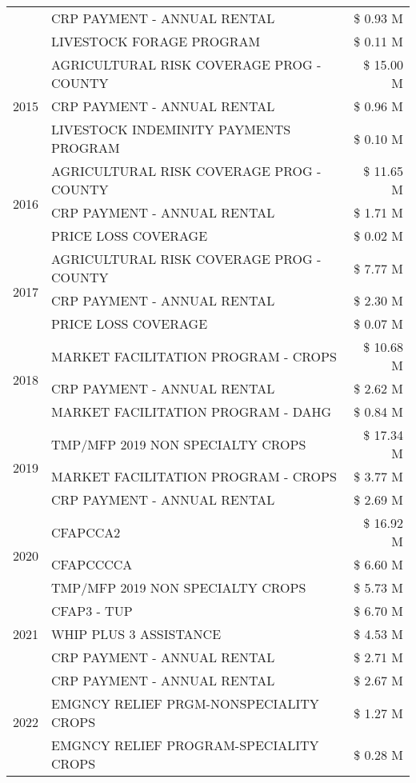 \begin{tabular}{llr}
 & CRP PAYMENT - ANNUAL RENTAL & \$ 0.93 M \\
 & LIVESTOCK FORAGE PROGRAM & \$ 0.11 M \\
\cline{1-3}
\multirow[t]{3}{*}{2015} & AGRICULTURAL RISK COVERAGE PROG - COUNTY & \$ 15.00 M \\
 & CRP PAYMENT - ANNUAL RENTAL & \$ 0.96 M \\
 & LIVESTOCK INDEMINITY PAYMENTS PROGRAM & \$ 0.10 M \\
\cline{1-3}
\multirow[t]{3}{*}{2016} & AGRICULTURAL RISK COVERAGE PROG - COUNTY & \$ 11.65 M \\
 & CRP PAYMENT - ANNUAL RENTAL & \$ 1.71 M \\
 & PRICE LOSS COVERAGE & \$ 0.02 M \\
\cline{1-3}
\multirow[t]{3}{*}{2017} & AGRICULTURAL RISK COVERAGE PROG - COUNTY & \$ 7.77 M \\
 & CRP PAYMENT - ANNUAL RENTAL & \$ 2.30 M \\
 & PRICE LOSS COVERAGE & \$ 0.07 M \\
\cline{1-3}
\multirow[t]{3}{*}{2018} & MARKET FACILITATION PROGRAM - CROPS & \$ 10.68 M \\
 & CRP PAYMENT - ANNUAL RENTAL & \$ 2.62 M \\
 & MARKET FACILITATION PROGRAM - DAHG & \$ 0.84 M \\
\cline{1-3}
\multirow[t]{3}{*}{2019} & TMP/MFP 2019 NON SPECIALTY CROPS & \$ 17.34 M \\
 & MARKET FACILITATION PROGRAM - CROPS & \$ 3.77 M \\
 & CRP PAYMENT - ANNUAL RENTAL & \$ 2.69 M \\
\cline{1-3}
\multirow[t]{3}{*}{2020} & CFAPCCA2 & \$ 16.92 M \\
 & CFAPCCCCA & \$ 6.60 M \\
 & TMP/MFP 2019 NON SPECIALTY CROPS & \$ 5.73 M \\
\cline{1-3}
\multirow[t]{3}{*}{2021} & CFAP3 - TUP & \$ 6.70 M \\
 & WHIP PLUS 3 ASSISTANCE & \$ 4.53 M \\
 & CRP PAYMENT - ANNUAL RENTAL & \$ 2.71 M \\
\cline{1-3}
\multirow[t]{3}{*}{2022} & CRP PAYMENT - ANNUAL RENTAL & \$ 2.67 M \\
 & EMGNCY RELIEF PRGM-NONSPECIALITY CROPS & \$ 1.27 M \\
 & EMGNCY RELIEF PROGRAM-SPECIALITY CROPS & \$ 0.28 M \\
\cline{1-3}
\bottomrule
\end{tabular}
